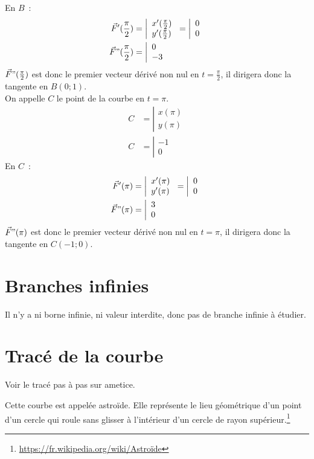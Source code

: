 \documentclass{article}
\begin{document}
En $B$~:
\begin{align*}
        \vec{F}'(\frac{\pi}{2})&=\left|\begin{array}{l}
                x'(\frac{\pi}{2})\\y'(\frac{\pi}{2})
        \end{array}\right.
        =          \left|\begin{array}{l}
                0\\0
        \end{array}\right.\\
        \vec{F}"(\frac{\pi}{2})&=\left|\begin{array}{l}
                 0\\-3
        \end{array}\right.
\end{align*}
$\vec{F}"(\frac{\pi}{2})$ est donc le premier vecteur dérivé non nul en $t=\frac{\pi}{2}$, il dirigera donc la tangente en $B(0;1)$.\\
On appelle $C$ le point de la courbe en $t=\pi$.
\begin{align*}
        C&=\left|\begin{array}{l}x(\pi)\\y(\pi)\end{array}\right.\\
                C&=\left|\begin{array}{l}-1\\0\end{array}\right.
\end{align*}
En $C$~:
\begin{align*}
        \vec{F}'(\pi)&=\left|\begin{array}{l}
                x'(\pi)\\y'(\pi)
        \end{array}\right.
        =          \left|\begin{array}{l}
                0\\0
        \end{array}\right.\\
        \vec{F}"(\pi)&=\left|\begin{array}{l}
                 3\\0
        \end{array}\right.
\end{align*}
$\vec{F}"(\pi)$ est donc le premier vecteur dérivé non nul en $t=\pi$, il dirigera donc la tangente en $C(-1;0)$.\\
\section{Branches infinies}
Il n'y a ni borne infinie, ni valeur interdite, donc pas de branche infinie à étudier.
\section{Tracé de la courbe}
Voir le tracé pas à pas sur ametice.

Cette courbe est appelée astroïde.
Elle représente le lieu géométrique d'un point d'un cercle qui roule sans glisser
à l'intérieur d'un cercle de rayon supérieur.\footnote{\url{https://fr.wikipedia.org/wiki/Astroïde}}
\end{document}
